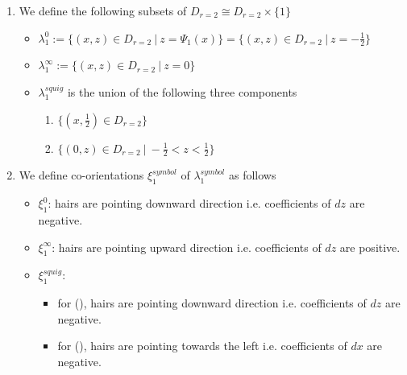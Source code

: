 \begin{definition}
\begin{enumerate}
\item We define the following subsets of $D_{r=2} \cong D_{r=2}\times \{1\}$
\begin{itemize}
\item $\lambda_1^0 := \{(x,z) \in D_{r=2} ~|~ z = \Psi_1(x)\} = \{(x,z) \in D_{r=2} ~|~ z = -\frac{1}{2}\}$

\item $\lambda_1^\infty := \{(x,z) \in D_{r=2} ~|~ z = 0 \}$

\item $\lambda_1^{squig}$ is the union of the following three components
\begin{enumerate}[label=(\roman*)]

\item $\{(x,\frac{1}{2}) \in D_{r=2} \}$

\item $\{(0,z) \in D_{r=2} ~|~ -\frac{1}{2} < z < \frac{1}{2} \}$
\end{enumerate}
\end{itemize}

\item We define co-orientations $\xi_1^{symbol}$ of $\lambda_1^{symbol}$ as follows
\begin{itemize}
\item $\xi_1^0$: hairs are pointing downward direction i.e. coefficients of $dz$ are negative.

\item $\xi_1^\infty$: hairs are pointing upward direction i.e. coefficients of $dz$ are positive.

\item $\xi_1^{squig}$: 
\begin{itemize}
\item for (), hairs are pointing downward direction i.e. coefficients of $dz$ are negative.
\item for (), hairs are pointing towards the left i.e. coefficients of $dx$ are negative.
\end{itemize}
\end{itemize}
\end{enumerate}
\end{definition}

